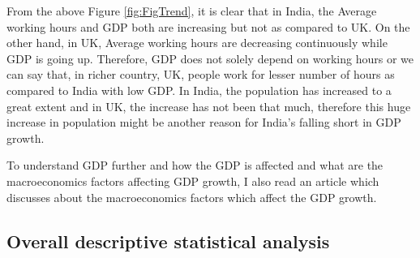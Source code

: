 \documentclass[11pt,a4paper,]{article}
\begin{document}
From the above Figure \ref{fig:FigTrend}, it is clear that in India, the Average working hours and GDP both are increasing but not as compared to UK. On the other hand, in UK, Average working hours are decreasing continuously while GDP is going up. Therefore, GDP does not solely depend on working hours or we can say that, in richer country, UK, people work for lesser number of hours as compared to India with low GDP. In India, the population has increased to a great extent and in UK, the increase has not been that much, therefore this huge increase in population might be another reason for India's falling short in GDP growth.

To understand GDP further and how the GDP is affected and what are the macroeconomics factors affecting GDP growth, I also read an article \textcite{article} which discusses about the macroeconomics factors which affect the GDP growth.


\hypertarget{overall-descriptive-statistical-analysis}{%
\subsection{Overall descriptive statistical analysis}\label{overall-descriptive-statistical-analysis}}
\end{document}

